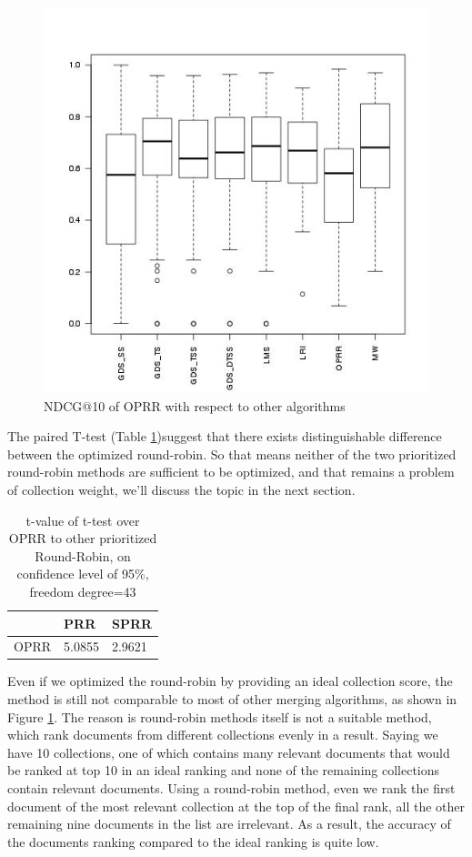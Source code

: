 \begin{figure}
\begin{center}
\includegraphics[scale=0.6]{images/OPRR}
\caption{NDCG@10 of OPRR with respect to other algorithms}
\label{fig:oprr}
\end{center}
\end{figure} 
The paired T-test (Table \ref{tb:tvalue-oprr})suggest that there exists distinguishable difference between the optimized round-robin. So that means neither of the two prioritized round-robin methods are sufficient to be optimized, and that remains a problem of collection weight, we'll discuss the topic in the next section.
 
\begin{table}
\centering
\small
\begin{tabular}{lll}
		&PRR&SPRR\\
\hline
OPRR	&5.0855&2.9621	\\
\end{tabular}
\footnotesize
\caption{t-value of t-test over OPRR to other prioritized Round-Robin, on confidence level of 95\%, freedom degree=43}
\label{tb:tvalue-oprr}
\end{table}
Even if we optimized the round-robin by providing an ideal collection score, the method is still not comparable to most of other merging algorithms, as shown in Figure \ref{fig:oprr}. The reason is round-robin methods itself is not a suitable method, which rank documents from different collections evenly  in a result. Saying we have 10 collections, one of which contains many relevant documents that would be ranked at top 10 in an ideal ranking and none of the remaining collections contain relevant documents. Using a round-robin method, even we rank the first document of the most relevant collection at the top of the final rank, all the other remaining nine documents in the list are irrelevant. As a result, the accuracy of the documents ranking compared to the ideal ranking is quite low.


